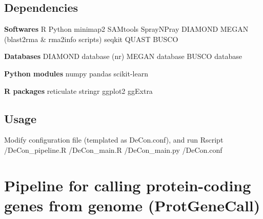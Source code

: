 \documentclass[11pt]{article}
\begin{document}
\begin{sloppypar}
\subsection{Dependencies}
\textbf{Softwares} \newline
R \newline
Python \newline
minimap2 \newline
SAMtools \newline
SprayNPray \newline
DIAMOND \newline
MEGAN (blast2rma & rma2info scripts) \newline
seqkit \newline
QUAST \newline
BUSCO \newline
\par
\textbf{Databases} \newline
DIAMOND database (nr) \newline
MEGAN database \newline
BUSCO database \newline
\par
\textbf{Python modules} \newline
numpy \newline
pandas \newline
scikit-learn \newline
\par
\textbf{R packages} \newline
reticulate \newline
stringr \newline
ggplot2 \newline
ggExtra
\subsection{Usage}
Modify configuration file (templated as DeCon.conf), and run \newline
Rscript /DeCon\_pipeline.R /DeCon\_main.R /DeCon\_main.py /DeCon.conf

\section{Pipeline for calling protein-coding genes from genome (ProtGeneCall)}

\printbibliography
\end{sloppypar}
\end{document}
